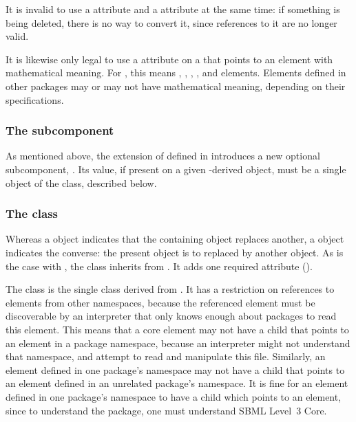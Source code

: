 It is invalid to use a  attribute and a
 attribute at the same time: if something is being
deleted, there is no way to convert it, since references to it are no
longer valid.

It is likewise only legal to use a  attribute on
a \ReplacedElement that points to an element with mathematical meaning.
For \sbmlthreecore, this means \Compartment, \Parameter, \Reaction,
\Species, and \SpeciesReference elements.  Elements defined in other
packages may or may not have mathematical meaning, depending on their
specifications.

\subsubsection{The \fixttspace{} subcomponent}

As mentioned above, the extension of \SBase defined in
 introduces a new optional subcomponent,
.  Its value, if present on a given \SBase-derived
object, must be a single object of the \ReplacedBy class, described
below.


\subsubsection{The \ReplacedBy class}
\label{replacedby-class}

Whereas a \ReplacedElement object indicates that the containing object
replaces another, a \ReplacedBy object indicates the converse: the
present object is to replaced by another object.  As is the case with
\ReplacedElement, the \ReplacedBy class inherits from \SBaseRef.  It
adds one required attribute ().

The \ReplacedBy class is the single class derived from \SBaseRef. It has
a restriction on references to elements from other namespaces, because
the referenced element must be discoverable by an interpreter that only
knows enough about packages to read this element.  This means that a
core element may not have a \ReplacedBy child that points to an element
in a package namespace, because an interpreter might not understand that
namespace, and attempt to read and manipulate this file.  Similarly, an
element defined in one package's namespace may not have a \ReplacedBy
child that points to an element defined in an unrelated package's
namespace.  It is fine for an element defined in one package's namespace
to have a \ReplacedBy child which points to an \sbmlthreecore element,
since to understand the package, one must understand SBML Level~3 Core.

